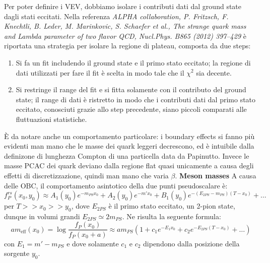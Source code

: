 \documentclass[12pt,a4paper,openright]{article}
\newcommand{\colg}{\textcolor{PineGreen}}
\begin{document}
\newline
\newline
Per poter definire i VEV, dobbiamo \colg{isolare i contributi dati dal ground state dagli stati eccitati}.
Nella referenza \textit{ALPHA collaboration, P. Fritzsch, F. Knechtli, B. Leder, M. Marinkovic,
S. Schaefer et al., The strange quark mass and Lambda parameter of two flavor QCD, Nucl.Phys. B865 (2012) 397–429} è riportata una strategia per isolare la regione di plateau, composta da due steps:
\begin{enumerate}
  \item Si fa un fit includendo il ground state e il primo stato eccitato; la regione di dati utilizzati per fare il fit è scelta in modo tale che il $\chi^2$ sia decente.
  \item Si restringe il range del fit e si fitta solamente con il contributo del ground state; il range di dati è ristretto in modo che i contributi dati dal primo stato eccitato, conosciuti grazie allo step precedente, siano piccoli comparati alle fluttuazioni statistiche.
\end{enumerate}
È da notare anche un comportamento particolare: \colg{i boundary effects si fanno più evidenti man mano che le masse dei quark leggeri decrescono}, ed è intuibile dalla definizone di lunghezza Compton di una particella data da Papinutto.
Invece le masse PCAC dei quark deviano dalla regione flat quasi unicamente a causa degli effetti di discretizzazione, quindi man mano che varia $\beta$.
\newline
\newline
{\bf Meson masses} \newline
A causa delle OBC, il comportamento asintotico della due punti pseudoscalare è:
\begin{equation*}
  f_P^{rs} (x_0,y_0) \approx A_1(y_0)e^{-m_{PS}x_0}+A_2(y_0)e^{-m'x_0}+B_1(y_0)e^{-(E_{2PS}-m_{PS})(T-x_0)}+\dots
\end{equation*}
per $T >> x_0 >> y_0$, dove $E_{2PS}$ è il primo stato eccitato, un 2-pion state, dunque in volumi grandi $E_{2PS} \simeq 2m_{PS}$.
Ne risulta la seguente formula:
\begin{equation*}
  am_{\text{eff}}(x_0) = \log\frac{f_P(x_0)}{f_P(x_0+a)} \approx a m_{PS} \left( 1 + c_1 e^{-E_1 x_0} + c_2 e^{- E_{2PS}(T-x_0)} + \dots \right)
\end{equation*}
con $E_1 = m' - m_{PS}$ e dove solamente $c_1$ e $c_2$ dipendono dalla posizione della sorgente $y_0$.
\newline
\newline
\end{document}
